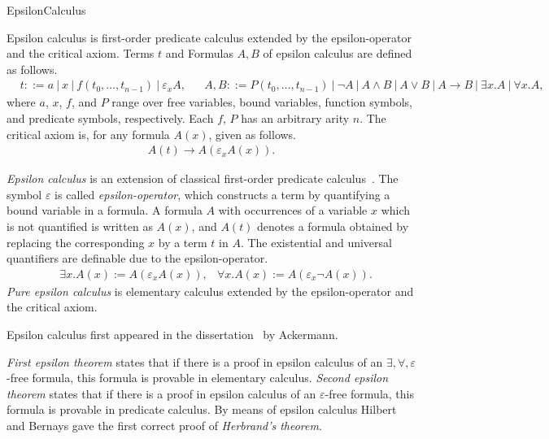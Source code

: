 \begin{entry}{EpsilonCalculus}  


\begin{calculus}

Epsilon calculus is first-order predicate calculus extended by the
epsilon-operator and the critical axiom.  Terms $t$ and Formulas $A,
B$ of epsilon calculus are defined as follows.
\begin{align*}
  & t ::= a ~|~ x ~|~ f(t_0, \ldots, t_{n-1}) ~|~ \varepsilon_x A, 
  && A, B ::= P(t_0, \ldots, t_{n-1}) ~|~ \neg A ~|~ A \land B ~|~ A \lor B ~|~ A \to B ~|~ \exists x. A ~|~ \forall x. A,
\end{align*}
where $a$, $x$, $f$, and $P$ range over free variables, bound
variables, function symbols, and predicate symbols, respectively.
Each $f$, $P$ has an arbitrary arity $n$.
The critical axiom is, for any formula $A(x)$, given as follows.
\begin{align*}
  A(t) \to A(\varepsilon_xA(x)).
\end{align*}
\end{calculus}

\begin{clarifications}
  \emph{Epsilon calculus} is an extension of classical first-order
  predicate
  calculus~\cite{HilbertBernays1939,MoserZach06,AvigadZach13}.  The
  symbol $\varepsilon$ is called \emph{epsilon-operator}, which
  constructs a term by quantifying a bound variable in a formula.  A
  formula $A$ with occurrences of a variable $x$ which is not
  quantified is written as $A(x)$, and $A(t)$ denotes a formula
  obtained by replacing the corresponding $x$ by a term $t$ in $A$.
  The existential and universal quantifiers are definable due to the
  epsilon-operator.
\begin{align*}
  & \exists x. A(x) := A(\varepsilon_x A(x)), & \forall x. A(x) := A(\varepsilon_x \neg A(x)).
\end{align*}
\emph{Pure epsilon calculus} is elementary calculus extended by the
epsilon-operator and the critical axiom.

\end{clarifications}

\begin{history}
Epsilon calculus first appeared in the
dissertation~\cite{Ackermann1924} by Ackermann.
\end{history}

\begin{technicalities}
\emph{First epsilon theorem} states that if there is a proof in
epsilon calculus of an $\exists,\forall,\varepsilon$-free formula,
this formula is provable in elementary calculus.  \emph{Second epsilon
  theorem} states that if there is a proof in epsilon calculus of an
$\varepsilon$-free formula, this formula is provable in predicate
calculus.  By means of epsilon calculus Hilbert and Bernays gave the
first correct proof of \emph{Herbrand's theorem}.
\end{technicalities}



\end{entry}
